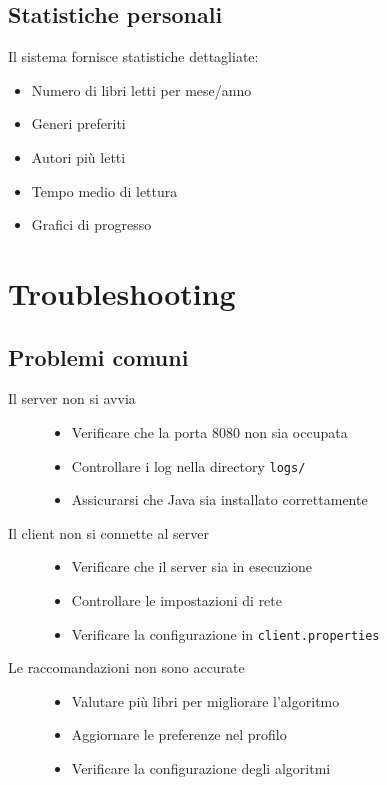 \documentclass[12pt,a4paper]{article}
\begin{document}
\subsection{Statistiche personali}

Il sistema fornisce statistiche dettagliate:

\begin{itemize}
    \item Numero di libri letti per mese/anno
    \item Generi preferiti
    \item Autori più letti
    \item Tempo medio di lettura
    \item Grafici di progresso
\end{itemize}

\section{Troubleshooting}

\subsection{Problemi comuni}

\begin{description}
    \item[Il server non si avvia]
    \begin{itemize}
        \item Verificare che la porta 8080 non sia occupata
        \item Controllare i log nella directory \texttt{logs/}
        \item Assicurarsi che Java sia installato correttamente
    \end{itemize}
    
    \item[Il client non si connette al server]
    \begin{itemize}
        \item Verificare che il server sia in esecuzione
        \item Controllare le impostazioni di rete
        \item Verificare la configurazione in \texttt{client.properties}
    \end{itemize}
    
    \item[Le raccomandazioni non sono accurate]
    \begin{itemize}
        \item Valutare più libri per migliorare l'algoritmo
        \item Aggiornare le preferenze nel profilo
        \item Verificare la configurazione degli algoritmi
    \end{itemize}
\end{description}
\end{document}
